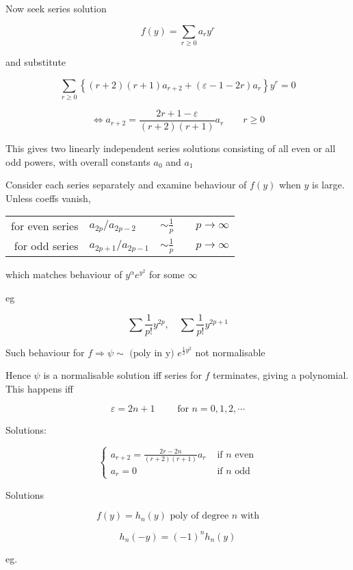 \documentclass[a4paper]{article}
\begin{document}
Now seek series solution

\[ f(y) = \sum_{r\geq 0} a_{r} y^{r} \]

and substitute

\[ \sum_{r\geq 0} \left\{   (r+2)(r+1)a_{r+2} + (\varepsilon  - 1 - 2r) a_{r}    \right\} y^{r} = 0  \]


\[ \iff a_{r+2} = \frac{2r + 1 - \varepsilon}{(r+2)(r+1)} a_{r} \qquad r \geq 0 \]

This gives two linearly independent series solutions consisting of all even or all odd powers, with overall constants $ a_{0} $ and $ a_{1} $

Consider each series separately and examine behaviour of $ f(y) $ when $ y $ is large. Unless coeffs vanish,

\begin{center}
	\begin{tabular}{rlll}
		for even series & $a_{2p} / a_{2p - 2} $ & $\sim \frac{1}{p}$ & $ \quad p \to \infty $\\
		for odd series & $a_{2p+1} / a_{2p - 1} $ & $\sim \frac{1}{p}$ & $ \quad  p \to \infty $
	\end{tabular}
\end{center}

which matches behaviour of $ y^{\alpha} e^{y^{2}} $ for some $ \infty $

eg

\[ \sum \frac{1}{p!} y^{2p}, \quad \sum \frac{1}{p!} y^{2p + 1}  \]

Such behaviour for $ f \Rightarrow \psi \sim \text{ (poly in y) }e^{\frac{1}{2}y^{2}}  $ not normalisable

Hence $ \psi $ is a normalisable solution iff series for $ f $ terminates, giving a polynomial. This happens iff

\[ \varepsilon = 2n + 1 \qquad \text{ for } n = 0,1,2,\cdots \]

Solutions:

\[ \begin{cases}  a_{r+2} = \frac{2r - 2n}{(r+2)(r+1)} a_{r} & \text{ if } n \text{ even} \\ a_{r} = 0 & \text{ if } n \text{ odd}\end{cases} \]

Solutions

\[ f(y) = h_{n}(y) \text{ poly of degree } n \text{ with} \]

\[ h_{n}(-y) = (-1)^{n} h_{n}(y) \]

eg.
\end{document}
